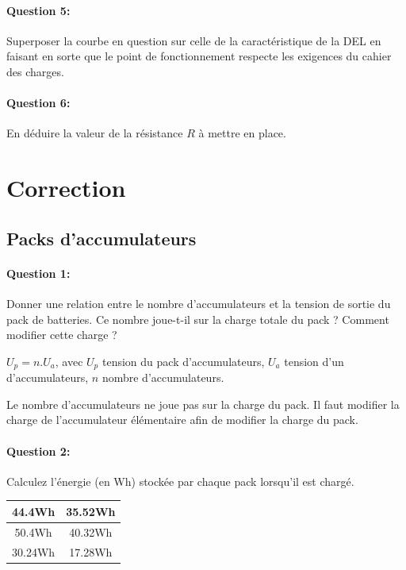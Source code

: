 \paragraph{Question 5:} Superposer la courbe en question sur celle de la caractéristique de la DEL en faisant en sorte que le point de fonctionnement respecte les exigences du cahier des charges.

\paragraph{Question 6:} En déduire la valeur de la résistance $R$ à mettre en place.

\ifdef{\public}{}

\newpage

\pagestyle{correction}

\section{Correction}

\subsection{Packs d'accumulateurs}
 
\paragraph{Question 1:} Donner une relation entre le nombre d'accumulateurs et la tension de sortie du pack de batteries. Ce nombre joue-t-il sur la charge totale du pack ? Comment modifier cette charge ?

$U_p=n.U_a$, avec $U_p$ tension du pack d'accumulateurs, $U_a$ tension d'un d'accumulateurs, $n$ nombre d'accumulateurs.

Le nombre d'accumulateurs ne joue pas sur la charge du pack. Il faut modifier la charge de l'accumulateur élémentaire afin de modifier la charge du pack.

\paragraph{Question 2:} Calculez l'énergie (en Wh) stockée par chaque pack lorsqu'il est chargé.

\begin{tabular}{|c|c|}
\hline
 44.4Wh & 35.52Wh \\
\hline
 50.4Wh & 40.32Wh \\
\hline
 30.24Wh & 17.28Wh \\
\hline
\end{tabular}

